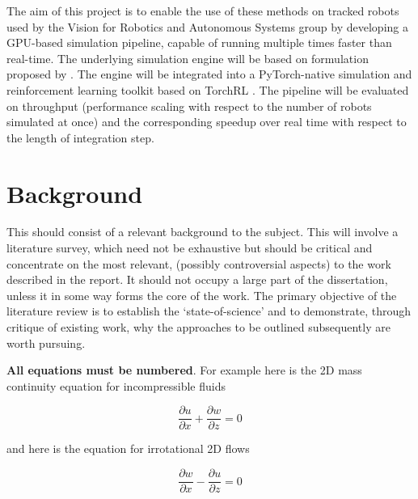 \documentclass[a4paper,12pt]{article}
\begin{document}
The aim of this project is to enable the use of these methods on tracked robots used by the Vision for Robotics and Autonomous Systems group by developing a GPU-based simulation pipeline, capable of running multiple times faster than real-time. The underlying simulation engine will be based on formulation proposed by \citet{Agishev_2024}. The engine will be integrated into a PyTorch-native \citep{paszke2019pytorchimperativestylehighperformance} simulation and reinforcement learning toolkit based on TorchRL \citep{bou2023torchrldatadrivendecisionmakinglibrary}. The pipeline will be evaluated on throughput (performance scaling with respect to the number of robots simulated at once) and the corresponding speedup over real time with respect to the length of integration step.





\clearpage


\section{Background}
\label{sec:background}

This should consist of a relevant background to the subject. This will involve a literature survey, which need not be exhaustive but should be critical and concentrate on the most relevant, (possibly controversial aspects) to the work described in the report. It should not occupy a large part of the dissertation, unless it in some way forms the core of the work. The primary objective of the literature review is to establish the ‘state-of-science’ and to demonstrate, through critique of existing work, why the approaches to be outlined subsequently are worth pursuing.

\textbf{All equations must be numbered}. For example here is the 2D mass continuity equation for incompressible fluids


\begin{equation}
  \label{eq:mass-continuity}
  \frac{\partial u}{\partial x} + \frac{\partial w}{\partial z} = 0
\end{equation}

and here is the equation for irrotational 2D flows

\begin{equation}
  \label{eq:irrotationality}
  \frac{\partial w}{\partial x} - \frac{\partial u}{\partial z} = 0
\end{equation}
\end{document}
